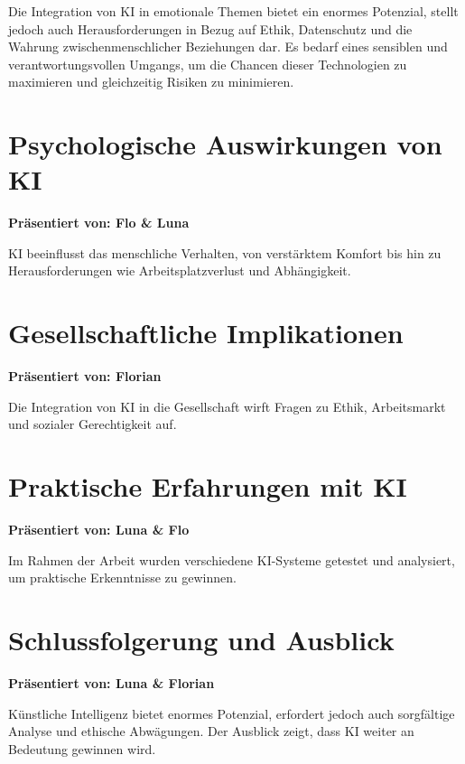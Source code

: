 \documentclass[a4paper,12pt]{article}
\begin{document}
Die Integration von KI in emotionale Themen bietet ein enormes Potenzial, stellt jedoch auch Herausforderungen in Bezug auf Ethik, Datenschutz und die Wahrung zwischenmenschlicher Beziehungen dar. Es bedarf eines sensiblen und verantwortungsvollen Umgangs, um die Chancen dieser Technologien zu maximieren und gleichzeitig Risiken zu minimieren.

\section{Psychologische Auswirkungen von KI}
\textbf{Präsentiert von: Flo \& Luna}

KI beeinflusst das menschliche Verhalten, von verstärktem Komfort bis hin zu Herausforderungen wie Arbeitsplatzverlust und Abhängigkeit.

\section{Gesellschaftliche Implikationen}
\textbf{Präsentiert von: Florian}

Die Integration von KI in die Gesellschaft wirft Fragen zu Ethik, Arbeitsmarkt und sozialer Gerechtigkeit auf.

\section{Praktische Erfahrungen mit KI}
\textbf{Präsentiert von: Luna \& Flo}

Im Rahmen der Arbeit wurden verschiedene KI-Systeme getestet und analysiert, um praktische Erkenntnisse zu gewinnen.

\section{Schlussfolgerung und Ausblick}
\textbf{Präsentiert von: Luna \& Florian}

Künstliche Intelligenz bietet enormes Potenzial, erfordert jedoch auch sorgfältige Analyse und ethische Abwägungen. Der Ausblick zeigt, dass KI weiter an Bedeutung gewinnen wird.

\newpage
\printbibliography
\end{document}
